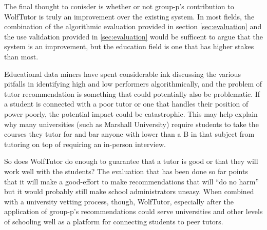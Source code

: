 The final thought to conisder is whether or not group-p's contribution to
WolfTutor is truly an improvement over the existing system. In most fields, the
combination of the algorithmic evaluation provided in section \ref{sec:evaluation}
and the use validation provided in \ref{sec:evaluation} would be sufficent to
argue that the system is an improvement, but the education field is one that has
higher stakes than most.  

Educational data miners have spent considerable ink discussing the various
pitfalls in identifying high and low performers algorithmically, and the problem
of tutor recommendation is something that could potentially also be problematic.
If a student is connected with a poor tutor or one that handles their position
of power poorly, the potential impact could be catastrophic.  This may help
explain why many universities (such as Marshall University) require students to
take the courses they tutor for and bar anyone with lower than a B in that
subject from tutoring on top of requiring an in-person interview.

So does WolfTutor do enough to guarantee that a tutor is good or that they will
work well with the students?  The evaluation that has been done so far points
that it will make a good-effort to make recommendations that will ``do no harm''
but it would probably still make school administrators uneasy.  When combined
with a university vetting process, though, WolfTutor, especially after the
application of group-p's recommendations could serve universities and other
levels of schooling well as a platform for connecting students to peer tutors.  

